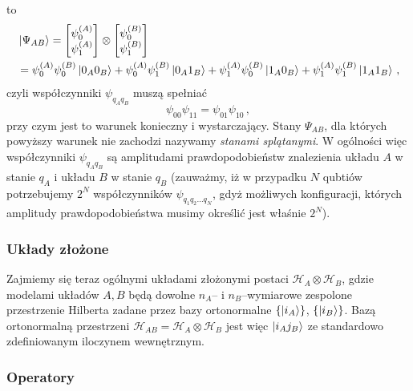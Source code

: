 \documentclass{myclass}
\begin{document}
\otimes {}\) to
\begin{equation*}
    \begin{split}
        &\ket{\Psi_{AB}} = \mqty[\psi_0^{(A)} \\ \psi_1^{(A)}]\otimes\mqty[\psi_0^{(B)} \\ \psi_1^{(B)}] \\
        &= \psi_0^{(A)}\psi_0^{(B)}\ket{0_A0_B} + \psi_0^{(A)}\psi_1^{(B)}\ket{0_A1_B} + \psi_1^{(A)}\psi_0^{(B)}\ket{1_A0_B} + \psi_1^{(A)}\psi_1^{(B)}\ket{1_A1_B}\,,
    \end{split}
\end{equation*}
czyli współczynniki \(\psi_{q_Aq_B}\) muszą spełniać
\begin{equation*}
    \psi_{00}\psi_{11} = \psi_{01}\psi_{10}\,,
\end{equation*}
przy czym jest to warunek konieczny i wystarczający. Stany \(\Psi_{AB}\), dla których powyższy
warunek nie zachodzi nazywamy \textit{stanami splątanymi}. W ogólności więc współczynniki
\(\psi_{q_Aq_B}\) są amplitudami prawdopodobieństw znalezienia układu \(A\) w stanie \(q_A\) i
układu \(B\) w stanie \(q_B\) (zauważmy, iż w przypadku \(N\) qubtiów potrzebujemy \(2^N\)
współczynników \(\psi_{q_1q_2\ldots q_N}\), gdyż możliwych konfiguracji, których amplitudy
prawdopodobieństwa musimy określić jest właśnie \(2^N\)).

\subsubsection{Układy złożone}

Zajmiemy się teraz ogólnymi układami złożonymi postaci \(\mathscr{H}_A\otimes\mathscr{H}_B\), gdzie
modelami układów \(A, B\) będą dowolne \(n_A\)-- i \(n_B\)--wymiarowe zespolone przestrzenie
Hilberta zadane przez bazy ortonormalne \(\{\ket{i_A}\}\), \(\{\ket{i_B}\}\). Bazą ortonormalną
przestrzeni \(\mathscr{H}_{AB} = \mathscr{H}_A \otimes \mathscr{H}_B\) jest więc \(\ket{i_A j_B}\)
ze standardowo zdefiniowanym iloczynem wewnętrznym.

\subsubsection*{Operatory}
\end{document}
